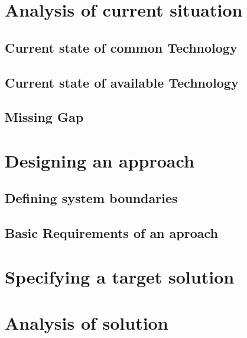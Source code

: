\documentclass[11pt,a4paper]{book}
\begin{document}
\chapter{Analysis of current situation\label{chap:analysis}}
\section{Current state of common Technology}
\section{Current state of available Technology}
\section{Missing Gap}


\chapter{Designing an approach}
\section{Defining system boundaries}
\section{Basic Requirements of an aproach}

\chapter{Specifying a target solution}

\chapter{Analysis of solution}
\end{document}

